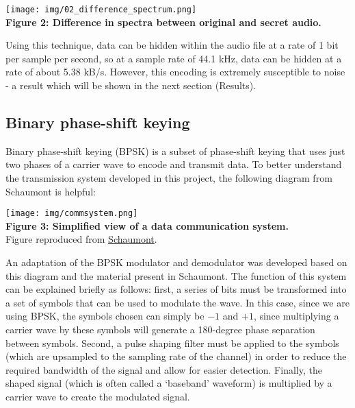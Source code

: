 \documentclass{article}
\begin{document}
\begin{center}
  \texttt{[image: img/02\_difference\_spectrum.png]} \\
  \textbf{Figure 2: Difference in spectra between original and secret audio.}
\end{center}

Using this technique, data can be hidden within
the audio file at a rate of 1 bit per sample per second, so at a sample rate
of 44.1 kHz, data can be hidden at a rate of about 5.38 kB/s. However, this
encoding is extremely susceptible to noise - a result which will be shown in the
next section (Results).

\newpage
\subsection{Binary phase-shift keying}
Binary phase-shift keying (BPSK) is a subset of phase-shift keying that uses
just two phases of a carrier wave to encode and transmit data. To better
understand the transmission system developed in this project, the following
diagram from Schaumont is helpful:

\begin{center}
  \texttt{[image: img/commsystem.png]} \\
  \textbf{Figure 3: Simplified view of a data communication system.} \\
  Figure reproduced from \href{https://schaumont.dyn.wpi.edu/ece4703b21/lecture9.html}{Schaumont}.
\end{center}

An adaptation of the BPSK modulator and demodulator was developed based on this
diagram and the material present in Schaumont. The function of this system can
be explained briefly as follows: first, a series of bits must be transformed
into a set of symbols that can be used to modulate the wave. In this case, since
we are using BPSK, the symbols chosen can simply be $-1$ and $+1$, since
multiplying a carrier wave by these symbols will generate a 180-degree phase
separation between symbols. Second, a pulse shaping filter must be applied to
the symbols (which are upsampled to the sampling rate of the channel) in order
to reduce the required bandwidth of the signal and allow for easier detection.
Finally, the shaped signal (which is often called a `baseband' waveform) is
multiplied by a carrier wave to create the modulated signal.

\vspace{6pt}
\end{document}
